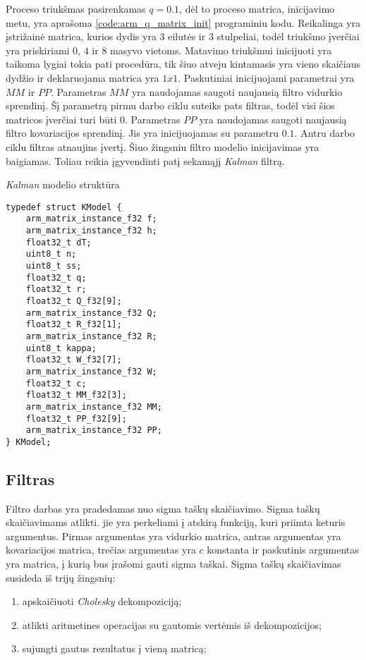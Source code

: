 Proceso triukšmas pasirenkamas $q = 0.1$, dėl to proceso matrica, inicijavimo metu, yra aprašoma \ref{code:arm_q_matrix_init} programiniu kodu.
Reikalinga yra įstrižainė matrica, kurios dydis yra 3 eilutės ir 3 stulpeliai, todėl triukšmo įverčiai yra priskiriami $0$, $4$ ir $8$ masyvo vietoms.
Matavimo triukšmui inicijuoti yra taikoma lygiai tokia pati procedūra, tik šiuo atveju kintamasis yra vieno skaičiaus dydžio ir deklaruojama matrica yra $1x1$.
Paskutiniai inicijuojami parametrai yra $MM$ ir $PP$.
Parametras $MM$ yra naudojamas saugoti naujausią filtro vidurkio sprendinį.
Šį parametrą pirmu darbo ciklu suteiks pats filtras, todėl visi šios matricos įverčiai turi būti $0$.
Parametras $PP$ yra naudojamas saugoti naujausią filtro kovariacijos sprendinį.
Jis yra inicijuojamas su parametru $0.1$.
Antru darbo ciklu filtras atnaujins įvertį.
Šiuo žingsniu filtro modelio inicijavimas yra baigiamas.
Toliau reikia įgyvendinti patį sekamąjį \textit{Kalman} filtrą.

\begin{cfigure}
  \centering
  \caption{\textit{Kalman} modelio struktūra}
  \label{code:kalman_model_struct}
  \begin{lstlisting}
typedef struct KModel {
    arm_matrix_instance_f32 f;
    arm_matrix_instance_f32 h;
    float32_t dT;
    uint8_t n;
    uint8_t ss;
    float32_t q;
    float32_t r;
    float32_t Q_f32[9];
    arm_matrix_instance_f32 Q;
    float32_t R_f32[1];
    arm_matrix_instance_f32 R;
    uint8_t kappa;
    float32_t W_f32[7];
    arm_matrix_instance_f32 W;
    float32_t c;
    float32_t MM_f32[3];
    arm_matrix_instance_f32 MM;
    float32_t PP_f32[9];
    arm_matrix_instance_f32 PP;
} KModel;
  \end{lstlisting}
\end{cfigure}


\subsection{Filtras}

Filtro darbas yra pradedamas nuo sigma taškų skaičiavimo.
Sigma taškų skaičiavimams atlikti. jie yra perkeliami į atskirą funkciją, kuri priimta keturis argumentus.
Pirmas argumentas yra vidurkio matrica, antras argumentas yra kovariacijos matrica, trečias argumentas yra $c$ konstanta ir paskutinis argumentas yra matrica, į kurią bus įrašomi gauti sigma taškai.
Sigma taškų skaičiavimas susideda iš trijų žingsnių:

\begin{enumerate}
    \item apskaičiuoti \textit{Cholesky} dekompoziciją;
    \item atlikti aritmetines operacijas su gautomis vertėmis iš dekompozicijos;
    \item sujungti gautus rezultatus į vieną matricą;
\end{enumerate}

